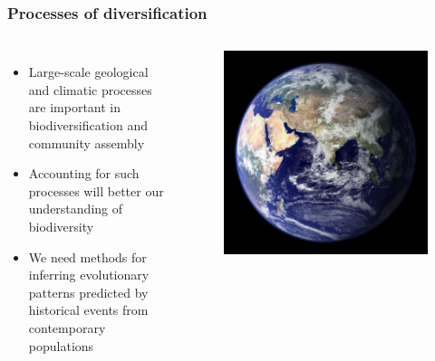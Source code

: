 {
\begin{frame}
    \frametitle{Processes of diversification}
    \begin{columns}[c]
        {
        \begin{itemize}
            \item<2-> Large-scale geological and climatic processes are
                important in biodiversification and community assembly
            \item<3-> Accounting for such processes will better our
                understanding of biodiversity
            \item<4-> We need methods for inferring evolutionary patterns
                predicted by historical events from contemporary populations
        \end{itemize}
        }
        \begin{figure}
            \begin{center}
            \includegraphics[width=\textwidth]{../images/earth-image.jpg}
            \end{center}
        \end{figure}
    \end{columns}
\end{frame}
}


